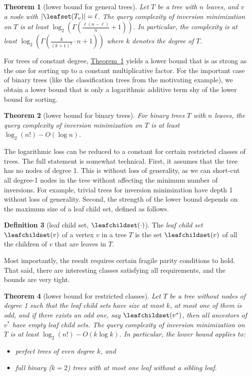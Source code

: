 \documentclass[11pt]{article}
\numberwithin{equation}{section}
\newtheorem{theorem}{Theorem}[section]
\theoremstyle{definition}
\newtheorem{definition}[theorem]{Definition}
\theoremstyle{plain}
\newcommand{\expref}[2]{\hyperref[#2]{#1~\ref{#2}}}
\begin{document}
\begin{theorem}[lower bound for general trees]\label{thm:main:general}
Let $T$ be a tree with $n$ leaves, and $v$ a node with $\lvert\leafset(T_v)\rvert = \ell$. The query complexity of inversion minimization on $T$ is at least $\log_2(\Gamma( \frac{\ell(n-\ell)}{n}+1 ))$. In particular, the complexity is at least $\log_2(\Gamma(\frac{k}{(k+1)^2} \cdot n+1))$ where $k$ denotes the degree of $T$.
\end{theorem}
For trees of constant degree, \expref{Theorem}{thm:main:general} yields a lower bound that is as strong as the one for sorting up to a constant multiplicative factor. For the important case of binary trees (like the classification trees from the motivating example), we obtain a lower bound that is only a logarithmic additive term shy of the lower bound for sorting.
\begin{theorem}[lower bound for binary trees]\label{thm:main:binary}
For binary trees $T$ with $n$ leaves, the query complexity of inversion minimization on $T$ is at least $\log_2(n!) - O(\log n)$.
\end{theorem}
The logarithmic loss can be reduced to a constant for certain restricted classes of trees. The full statement is somewhat technical. First, it assumes that the tree has no nodes of degree 1. This is without loss of generality, as we can short-cut all degree-1 nodes in the tree without affecting the minimum number of inversions. For example, trivial trees for inversion minimization have depth 1 without loss of generality. Second, the strength of the lower bound depends on the maximum size of a leaf child set, defined as follows.
\begin{definition}[leaf child set, $\leafchildset(\cdot)$]\label{def:leaf-child-set} The \emph{leaf child set} $\leafchildset(v)$ of a vertex $v$ in a tree $T$ is the set $\leafchildset(v)$ of all the children of $v$ that are leaves in $T$.
\end{definition}
Most importantly, the result requires certain fragile parity conditions to hold. That said, there are interesting classes satisfying all requirements, and the bounds are very tight. 
\begin{theorem}[lower bound for restricted classes]\label{thm:main:special}
Let $T$ be a tree without nodes of degree 1 such that the leaf child sets have size at most $k$, at most one of them is odd, and if there exists an odd one, say $\leafchildset(v^*)$, then all ancestors of $v^*$ have empty leaf child sets. The query complexity of inversion minimization on $T$ is at least $\log_2(n!) - O(k \log k)$. In particular, the lower bound applies to:
\begin{itemize}
\item perfect trees of even degree $k$, and
\item full binary ($k=2$) trees with at most one leaf without a sibling leaf.
\end{itemize}
\end{theorem}
\end{document}

